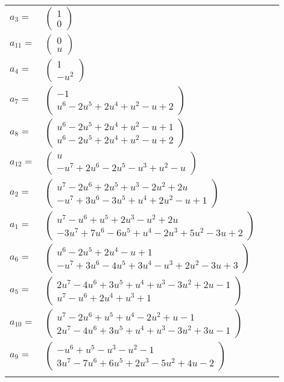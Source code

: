 \documentclass[1p]{elsarticle_modified}
\theoremstyle{definition}
\begin{document}
\begin{tabular}{m{7pt} m{180pt} m{7pt} m{180pt} }
\flushright $a_{3}=$&$\begin{pmatrix}1\\0\end{pmatrix}$ \\
\flushright $a_{11}=$&$\begin{pmatrix}0\\u\end{pmatrix}$ \\
\flushright $a_{4}=$&$\begin{pmatrix}1\\- u^2\end{pmatrix}$ \\
\flushright $a_{7}=$&$\begin{pmatrix}-1\\u^6-2 u^5+2 u^4+u^2- u+2\end{pmatrix}$ \\
\flushright $a_{8}=$&$\begin{pmatrix}u^6-2 u^5+2 u^4+u^2- u+1\\u^6-2 u^5+2 u^4+u^2- u+2\end{pmatrix}$ \\
\flushright $a_{12}=$&$\begin{pmatrix}u\\- u^7+2 u^6-2 u^5- u^3+u^2- u\end{pmatrix}$ \\
\flushright $a_{2}=$&$\begin{pmatrix}u^7-2 u^6+2 u^5+u^3-2 u^2+2 u\\- u^7+3 u^6-3 u^5+u^4+2 u^2- u+1\end{pmatrix}$ \\
\flushright $a_{1}=$&$\begin{pmatrix}u^7- u^6+u^5+2 u^3- u^2+2 u\\-3 u^7+7 u^6-6 u^5+u^4-2 u^3+5 u^2-3 u+2\end{pmatrix}$ \\
\flushright $a_{6}=$&$\begin{pmatrix}u^6-2 u^5+2 u^4- u+1\\- u^7+3 u^6-4 u^5+3 u^4- u^3+2 u^2-3 u+3\end{pmatrix}$ \\
\flushright $a_{5}=$&$\begin{pmatrix}2 u^7-4 u^6+3 u^5+u^4+u^3-3 u^2+2 u-1\\u^7- u^6+2 u^4+u^3+1\end{pmatrix}$ \\
\flushright $a_{10}=$&$\begin{pmatrix}u^7-2 u^6+u^5+u^4-2 u^2+u-1\\2 u^7-4 u^6+3 u^5+u^4+u^3-3 u^2+3 u-1\end{pmatrix}$ \\
\flushright $a_{9}=$&$\begin{pmatrix}- u^6+u^5- u^3- u^2-1\\3 u^7-7 u^6+6 u^5+2 u^3-5 u^2+4 u-2\end{pmatrix}$\\&\end{tabular}
\end{document}
